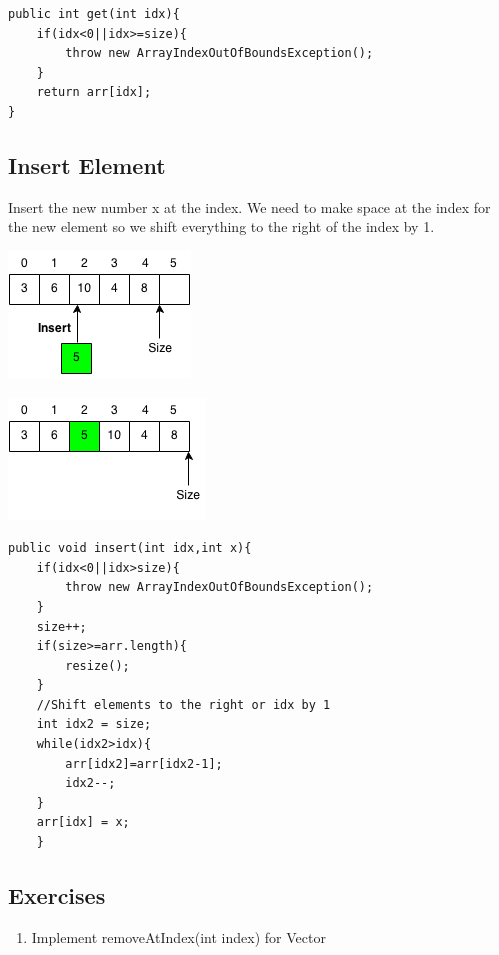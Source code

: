 \documentclass[11pt,oneside]{book}
\makeatletter
\def\maxwidth#1{\ifdim\Gin@nat@width>#1 #1\else\Gin@nat@width\fi}
\makeatother
\begin{document}
\begin{lstlisting}
public int get(int idx){
    if(idx<0||idx>=size){
        throw new ArrayIndexOutOfBoundsException();
    }   
    return arr[idx];
}
\end{lstlisting}

\subsection{Insert Element}

Insert the new number x at the index. We need to make space at the index for the new element so we shift everything to the right of the index by 1.

\includegraphics[width=\maxwidth{\textwidth}]{vectorinsert.png}

\includegraphics[width=\maxwidth{\textwidth}]{vectorinsert2.png}

\begin{lstlisting}
public void insert(int idx,int x){
    if(idx<0||idx>size){
        throw new ArrayIndexOutOfBoundsException();
    }
    size++;
    if(size>=arr.length){
        resize();
    }
    //Shift elements to the right or idx by 1
    int idx2 = size;
    while(idx2>idx){
        arr[idx2]=arr[idx2-1];
        idx2--;
    }   
    arr[idx] = x;
    }
\end{lstlisting}

\subsection{Exercises}

\begin{enumerate}
\item Implement removeAtIndex(int index) for Vector
\end{enumerate}
\end{document}
